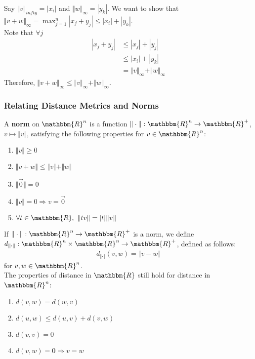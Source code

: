 \documentclass[10pt]{extarticle}
\newcommand{\R}{\mathbbm{R}}
\begin{document}
      Say $\Vert v \Vert_{infty} = |x_i|$ and $\Vert w \Vert_{\infty} = |y_k|$. We want to show that $\Vert v + w \Vert_{\infty} = \max_{j=1}^{n}|x_j + y_j| \leq |x_i| + |y_k|$.\\

      Note that $\forall j$
      \begin{align*}
        |x_j + y_j| &\leq |x_j| + |y_j| \tag*{Triangle Inequality}\\
                    &\leq |x_i| + |y_k| \\
                    &= \Vert v \Vert_{\infty} + \Vert w \Vert_{\infty}
      \end{align*}
      Therefore, $\Vert v + w \Vert_{\infty} \leq \Vert v \Vert_{\infty} + \Vert w \Vert_{\infty}$.
    \subsubsection{Relating Distance Metrics and Norms}%
    A \textbf{norm} on $\R^n$ is a function $\Vert \cdot \Vert: \R^n \rightarrow \R^+$, $v\mapsto \Vert v \Vert$, satisfying the following properties for $v\in\R^n$:
    \begin{enumerate}[(1)]
      \item $\Vert v \Vert \geq 0$
      \item $\Vert v + w \Vert \leq \Vert v \Vert + \Vert w \Vert$
      \item $\Vert \vec{0}\Vert = 0$
      \item $\Vert v \Vert = 0\Rightarrow v = \vec{0}$
      \item $\forall t\in\R,~\Vert tv \Vert = |t|\Vert v\Vert$
    \end{enumerate}
    If $\Vert \cdot \Vert: \R^n \rightarrow \R^+$ is a norm, we define $d_{\Vert \cdot \Vert}: \R^n \times \R^n \rightarrow \R^+$, defined as follows:
    \begin{align*}
      d_{\Vert \cdot \Vert}(v,w) = \Vert v-w \Vert
    \end{align*}
    for $v,w\in\R^n$.\\

    The properties of distance in $\R$ still hold for distance in $\R^n$:
    \begin{enumerate}[(1)]
      \item $d(v,w) = d(w,v)$
      \item $d(u,w) \leq d(u,v) + d(v,w)$
      \item $d(v,v) = 0$
      \item $d(v,w) = 0 \Rightarrow v=w$
    \end{enumerate}
\end{document}
